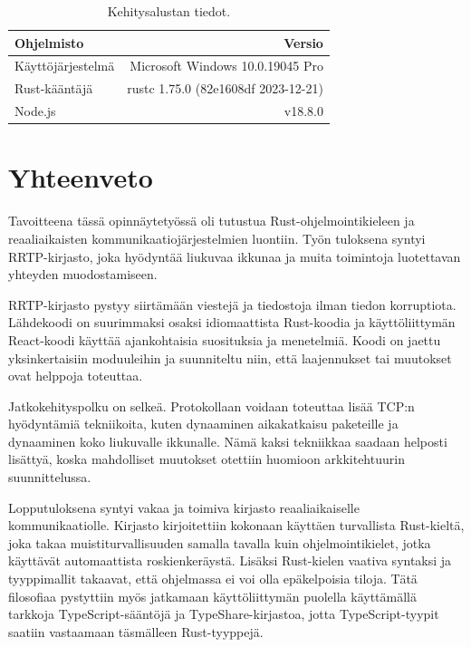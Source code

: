 \documentclass[a4paper,12pt]{article}
\begin{document}
    \begin{table}[h!]
        \centering
        \begin{tabularx}{\textwidth}{|X|r|}
            \hline
            \textbf{Ohjelmisto} & \textbf{Versio} \\ \hline
            Käyttöjärjestelmä & Microsoft Windows 10.0.19045 Pro    \\ \hline
            Rust-kääntäjä     & rustc 1.75.0 (82e1608df 2023-12-21) \\ \hline
            Node.js           & v18.8.0 \\ \hline
        \end{tabularx}
        \caption{Kehitysalustan tiedot.}
        \label{tab:main_pc}
    \end{table}

    \section{Yhteenveto}
    Tavoitteena tässä opinnäytetyössä oli tutustua Rust-ohjelmointikieleen ja
    reaaliaikaisten kommunikaatiojärjestelmien luontiin. Työn tuloksena syntyi RRTP-kirjasto, joka hyödyntää liukuvaa ikkunaa ja muita toimintoja luotettavan yhteyden muodostamiseen.\par

    RRTP-kirjasto pystyy siirtämään viestejä ja tiedostoja ilman tiedon korruptiota. Lähdekoodi on suurimmaksi osaksi idiomaattista Rust-koodia ja käyttöliittymän React-koodi käyttää ajankohtaisia suosituksia ja menetelmiä.
    Koodi on jaettu yksinkertaisiin moduuleihin ja suunniteltu niin, että laajennukset tai muutokset ovat helppoja toteuttaa.\par

    Jatkokehityspolku on selkeä. Protokollaan voidaan toteuttaa lisää TCP:n hyödyntämiä tekniikoita, kuten dynaaminen aikakatkaisu paketeille ja dynaaminen koko liukuvalle ikkunalle. Nämä kaksi tekniikkaa saadaan helposti lisättyä, koska mahdolliset muutokset otettiin huomioon arkkitehtuurin suunnittelussa.\par

    Lopputuloksena syntyi vakaa ja toimiva kirjasto reaaliaikaiselle kommunikaatiolle. Kirjasto kirjoitettiin kokonaan käyttäen turvallista Rust-kieltä, joka takaa muistiturvallisuuden samalla tavalla kuin ohjelmointikielet, jotka käyttävät automaattista roskienkeräystä. Lisäksi Rust-kielen vaativa syntaksi ja
    tyyppimallit takaavat, että ohjelmassa ei voi olla epäkelpoisia tiloja.
    Tätä filosofiaa pystyttiin myös jatkamaan käyttöliittymän puolella käyttämällä
    tarkkoja TypeScript-sääntöjä ja TypeShare-kirjastoa, jotta TypeScript-tyypit saatiin vastaamaan täsmälleen Rust-tyyppejä.\par
\end{document}
